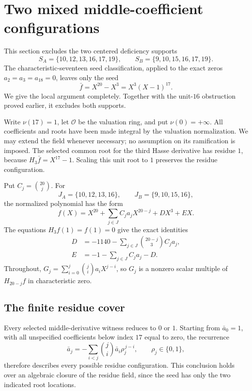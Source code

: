\documentclass[
  british,
  10pt,
  a4paper,
]{article}
\begin{document}
\section{Two mixed middle-coefficient
configurations}\label{two-mixed-middle-coefficient-configurations}

This section excludes the two centered deficiency supports \[
S_A=\{10,12,13,16,17,19\},\qquad
S_B=\{9,10,15,16,17,19\}.
\] The characteristic-seventeen seed classification, applied to the
exact zeros \(a_2=a_3=a_{18}=0\), leaves only the seed \[
\bar f=X^{20}-X^3=X^3(X-1)^{17}.
\] We give the local argument completely. Together with the unit-\(16\)
obstruction proved earlier, it excludes both supports.

Write \(\nu(17)=1\), let \(\mathcal O\) be the valuation ring, and put
\(\nu(0)=+\infty\). All coefficients and roots have been made integral
by the valuation normalization. We may extend the field whenever
necessary; no assumption on its ramification is imposed. The selected
common root for the third Hasse derivative has residue \(1\), because
\(H_3\bar f=X^{17}-1\). Scaling this unit root to \(1\) preserves the
residue configuration.

Put \(C_j=\binom{20}{j}\). For \[
J_A=\{10,12,13,16\},\qquad J_B=\{9,10,15,16\},
\] the normalized polynomial has the form \[
f(X)=X^{20}+\sum_{j\in J}C_ja_jX^{20-j}+DX^3+EX.
\] The equations \(H_3f(1)=f(1)=0\) give the exact identities \[
\begin{aligned}
D&=-1140-\sum_{j\in J}\binom{20-j}{3}C_ja_j,\\
E&=-1-\sum_{j\in J}C_ja_j-D.
\end{aligned}                                                    \tag{M1}
\] Throughout, \(G_j=\sum_{i=0}^j\binom ji a_iX^{j-i}\), so \(G_j\) is a
nonzero scalar multiple of \(H_{20-j}f\) in characteristic zero.

\subsection{The finite residue cover}\label{the-finite-residue-cover}

Every selected middle-derivative witness reduces to \(0\) or \(1\).
Starting from \(\bar a_0=1\), with all unspecified coefficients below
index \(17\) equal to zero, the recurrence \[
\bar a_j=-\sum_{i<j}\binom ji\bar a_i\rho_j^{\,j-i},
\qquad \rho_j\in\{0,1\},                                      \tag{M2}
\] therefore describes every possible residue configuration. This
conclusion holds over an algebraic closure of the residue field, since
the seed has only the two indicated root locations.
\end{document}
